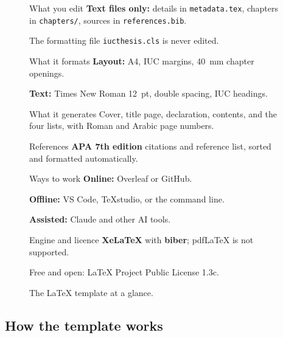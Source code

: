 \documentclass[11pt,a4paper]{article}
\newcommand\file[1]{\texttt{#1}}
\begin{document}
\begin{figure}[H]
\begin{tcbraster}[raster columns=2,raster equal height=rows,raster column skip=9pt,
  raster row skip=9pt]
\begin{card}{What you edit}
  \textbf{Text files only:} details in \file{metadata.tex}, chapters in
  \file{chapters/}, sources in \file{references.bib}.\par
  The formatting file \file{iucthesis.cls} is never edited.
\end{card}
\begin{card}{What it formats}
  \textbf{Layout:} A4, IUC margins, 40~mm chapter openings.\par
  \textbf{Text:} Times New Roman 12~pt, double spacing, IUC headings.
\end{card}
\begin{card}{What it generates}
  Cover, title page, declaration, contents, and the four lists, with Roman
  and Arabic page numbers.
\end{card}
\begin{card}{References}
  \textbf{APA 7th edition} citations and reference list, sorted and formatted
  automatically.
\end{card}
\begin{card}{Ways to work}
  \textbf{Online:} Overleaf or GitHub.\par
  \textbf{Offline:} VS Code, TeXstudio, or the command line.\par
  \textbf{Assisted:} Claude and other AI tools.
\end{card}
\begin{card}{Engine and licence}
  \textbf{XeLaTeX} with \textbf{biber}; pdfLaTeX is not supported.\par
  Free and open: LaTeX Project Public License 1.3c.
\end{card}
\end{tcbraster}
\caption{The LaTeX template at a glance.}
\label{fig:tglance}
\end{figure}

\subsection{How the template works}
\end{document}

